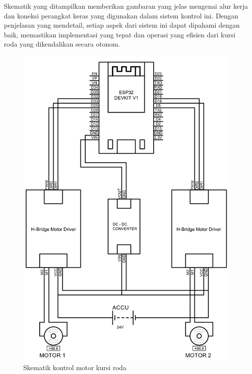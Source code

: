 Skematik yang ditampilkan memberikan gambaran yang jelas mengenai alur kerja dan koneksi perangkat keras yang digunakan dalam sistem kontrol ini. Dengan penjelasan yang mendetail, setiap aspek dari sistem ini dapat dipahami dengan baik, memastikan implementasi yang tepat dan operasi yang efisien dari kursi roda yang dikendalikan secara otonom. \cite{ekatama2024perancangan}

\begin{figure}[H]
  \centering

  \includegraphics[scale=0.2]{gambar/Schematics.png}

  \caption{Skematik kontrol motor kursi roda}
  \label{fig:Skematik Kontrol motor Kursi roda.}
\end{figure}

